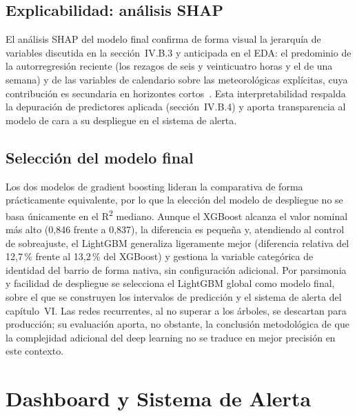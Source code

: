 \documentclass[12pt, a4paper]{article}
\begin{document}
\subsection{Explicabilidad: análisis SHAP}

El análisis SHAP del modelo final confirma de forma visual la jerarquía de variables discutida en la sección~IV.B.3 y anticipada en el EDA: el predominio de la autorregresión reciente (los rezagos de seis y veinticuatro horas y el de una semana) y de las variables de calendario sobre las meteorológicas explícitas, cuya contribución es secundaria en horizontes cortos~\cite{pardo2002}. Esta interpretabilidad respalda la depuración de predictores aplicada (sección~IV.B.4) y aporta transparencia al modelo de cara a su despliegue en el sistema de alerta.



\subsection{Selección del modelo final}

Los dos modelos de gradient boosting lideran la comparativa de forma prácticamente equivalente, por lo que la elección del modelo de despliegue no se basa únicamente en el R\textsuperscript{2} mediano. Aunque el XGBoost alcanza el valor nominal más alto (0,846 frente a 0,837), la diferencia es pequeña y, atendiendo al control de sobreajuste, el LightGBM generaliza ligeramente mejor (diferencia relativa del 12,7\,\% frente al 13,2\,\% del XGBoost) y gestiona la variable categórica de identidad del barrio de forma nativa, sin configuración adicional. Por parsimonia y facilidad de despliegue se selecciona el LightGBM global como modelo final, sobre el que se construyen los intervalos de predicción y el sistema de alerta del capítulo~VI. Las redes recurrentes, al no superar a los árboles, se descartan para producción; su evaluación aporta, no obstante, la conclusión metodológica de que la complejidad adicional del deep learning no se traduce en mejor precisión en este contexto.


\section{Dashboard y Sistema de Alerta}
\end{document}
